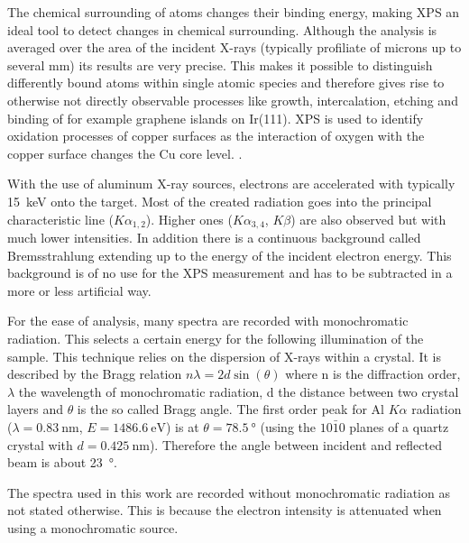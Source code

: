 \cite{zemlyanov_versatile_2018}
The  chemical surrounding of atoms changes their binding energy, making XPS an ideal tool to detect changes in chemical surrounding. Although the analysis is averaged over the area of the incident X-rays (typically profiliate of microns up to several mm) its results are very precise. This makes it possible to distinguish differently bound atoms within single atomic species and therefore gives rise to otherwise not directly observable processes like growth, intercalation, etching and binding of for example graphene islands on Ir(111)\cite{busse_graphene_2011-1,granas_oxygen_2012}. XPS is used to identify oxidation processes of copper surfaces as the interaction of oxygen with the copper surface changes the Cu core level. \cite{deroubaix_x-ray_1992}.

With the use of aluminum X-ray sources, electrons are accelerated with typically \SI{15}{\keV} onto the target. Most of the created radiation goes into the principal characteristic line ($K\alpha_{1,2}$). Higher ones ($K\alpha_{3,4}$, $K\beta$) are also observed but with much lower intensities. In addition there is a continuous background called Bremsstrahlung extending up to the energy of the incident electron energy. This background is of no use for the XPS measurement and has to be subtracted in a more or less artificial way.

For the ease of analysis, many spectra are recorded with monochromatic radiation. This selects a certain energy for the following illumination of the sample. This technique relies on the dispersion of X-rays within a crystal. It is described by the Bragg relation $n\lambda = 2d\sin(\theta)$ where n is the diffraction order, $\lambda$ the wavelength of monochromatic radiation, d the distance between two crystal layers and $\theta$ is the so called Bragg angle. The first order peak for Al $K\alpha$ radiation ($\lambda=\SI{0,83}{\nm}$, $E=\SI{1486,6}{\eV}$) is at $\theta=\SI{78.5}{\degree}$ (using the $10\bar10$ planes of a quartz crystal with $d=\SI{0,425}{\nm}$). Therefore the angle between incident and reflected beam is about \SI{23}{\degree}.\cite{Riviere_90}

The spectra used in this work are recorded without monochromatic radiation as not stated otherwise. This is because the electron intensity is attenuated when using a monochromatic source.

